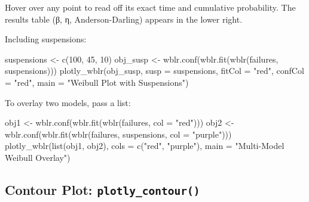 \documentclass[
  letterpaper,
  DIV=11,
  numbers=noendperiod]{scrreprt}
\newenvironment{Shaded}{\begin{snugshade}}{\end{snugshade}}
\newcommand{\AttributeTok}[1]{\textcolor[rgb]{0.40,0.45,0.13}{#1}}
\newcommand{\DecValTok}[1]{\textcolor[rgb]{0.68,0.00,0.00}{#1}}
\newcommand{\FunctionTok}[1]{\textcolor[rgb]{0.28,0.35,0.67}{#1}}
\newcommand{\NormalTok}[1]{\textcolor[rgb]{0.00,0.23,0.31}{#1}}
\newcommand{\OtherTok}[1]{\textcolor[rgb]{0.00,0.23,0.31}{#1}}
\newcommand{\StringTok}[1]{\textcolor[rgb]{0.13,0.47,0.30}{#1}}
\begin{document}
Hover over any point to read off its exact time and cumulative
probability. The results table (β, η, Anderson-Darling) appears in the
lower right.

Including suspensions:

\begin{Shaded}
\begin{Highlighting}[]
\NormalTok{suspensions }\OtherTok{\textless{}{-}} \FunctionTok{c}\NormalTok{(}\DecValTok{100}\NormalTok{, }\DecValTok{45}\NormalTok{, }\DecValTok{10}\NormalTok{)}
\NormalTok{obj\_susp }\OtherTok{\textless{}{-}} \FunctionTok{wblr.conf}\NormalTok{(}\FunctionTok{wblr.fit}\NormalTok{(}\FunctionTok{wblr}\NormalTok{(failures, suspensions)))}
\FunctionTok{plotly\_wblr}\NormalTok{(obj\_susp, }\AttributeTok{susp =}\NormalTok{ suspensions,}
            \AttributeTok{fitCol =} \StringTok{"red"}\NormalTok{, }\AttributeTok{confCol =} \StringTok{"red"}\NormalTok{,}
            \AttributeTok{main =} \StringTok{"Weibull Plot with Suspensions"}\NormalTok{)}
\end{Highlighting}
\end{Shaded}

To overlay two models, pass a list:

\begin{Shaded}
\begin{Highlighting}[]
\NormalTok{obj1 }\OtherTok{\textless{}{-}} \FunctionTok{wblr.conf}\NormalTok{(}\FunctionTok{wblr.fit}\NormalTok{(}\FunctionTok{wblr}\NormalTok{(failures,             }\AttributeTok{col =} \StringTok{"red"}\NormalTok{)))}
\NormalTok{obj2 }\OtherTok{\textless{}{-}} \FunctionTok{wblr.conf}\NormalTok{(}\FunctionTok{wblr.fit}\NormalTok{(}\FunctionTok{wblr}\NormalTok{(failures, suspensions, }\AttributeTok{col =} \StringTok{"purple"}\NormalTok{)))}
\FunctionTok{plotly\_wblr}\NormalTok{(}\FunctionTok{list}\NormalTok{(obj1, obj2),}
            \AttributeTok{cols  =} \FunctionTok{c}\NormalTok{(}\StringTok{"red"}\NormalTok{, }\StringTok{"purple"}\NormalTok{),}
            \AttributeTok{main  =} \StringTok{"Multi{-}Model Weibull Overlay"}\NormalTok{)}
\end{Highlighting}
\end{Shaded}

\subsection{\texorpdfstring{Contour Plot:
\texttt{plotly\_contour()}}{Contour Plot: plotly\_contour()}}\label{contour-plot-plotly_contour}
\end{document}
